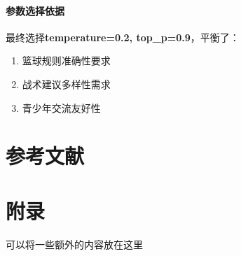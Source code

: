\documentclass{article}
\theoremstyle{plain}
\theoremstyle{definition}
\theoremstyle{remark}
\begin{document}
\paragraph{参数选择依据}
最终选择\textbf{temperature=0.2, top\_p=0.9}，平衡了：
\begin{enumerate}
\item 篮球规则准确性要求
\item 战术建议多样性需求
\item 青少年交流友好性
\end{enumerate}


\section{参考文献}




\newpage
\appendix
\onecolumn
\section{附录}

可以将一些额外的内容放在这里
\end{document}
